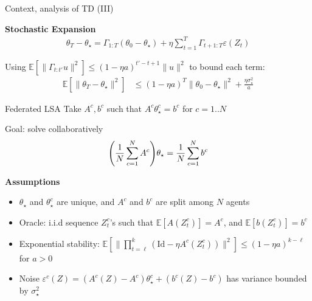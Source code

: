 \documentclass[aspectratio=169,14pt]{beamer}
\begin{document}
\begin{frame}[t]{Context, analysis of TD (III) }

  \textbf{Stochastic Expansion}
  \begin{align*}
    \theta_T - \theta_\star
    =
    \Gamma_{1:T} (\theta_0 - \theta_\star) + \eta \sum_{t=1}^T \Gamma_{t+1:T} \varepsilon(Z_t)
  \end{align*}

  \vspace{-0.5em}

  Using $\mathbb{E}[ \| \Gamma_{t:t'} u  \|^2 ] \le (1 - \eta a)^{t' - t + 1} \| u \|^2$ to bound each term:
  \begin{align*}
    \mathbb{E} [ \| \theta_T - \theta_\star \|^2 ]
    & \le
      (1 - \eta a)^T \| \theta_0 - \theta_\star \|^2
      + \frac{\eta \sigma_\star^2}{a}
  \end{align*}

  \vspace{0.5em}
  
\end{frame}


\begin{frame}{Federated LSA}
  Take $A^c, b^c$ such that $A^c \theta_\star^c = b^c$ for $c = 1 .. N$

  \pause
  
  Goal: solve collaboratively
  \begin{equation}
    \small
    \nonumber
    \Bigg( \frac{1}{N} \sum_{c=1}^{N} A^c \Bigg) \theta_\star
    = 
    \frac{1}{N} \sum_{c=1}^{N} b^c
  \end{equation}
  \vspace{-1em}

  \pause
  
  \textbf{Assumptions}

  \vspace{-0.5em}
  
  \begin{itemize}\setlength{\itemindent}{-1em}
    \small
  \item $\theta_\star$ and $\theta_\star^c$ are unique, and $A^c$ and $b^c$ are split among $N$ agents
    
  \item Oracle: i.i.d sequence $Z_{t}^c$'s such that
    $\mathbb{E} [A(Z_{t}^c)] = A^c$, and
    $\mathbb{E} [b(Z_{t}^c)] = b^c$
    
  \item Exponential stability: $\mathbb{E}[ \| \prod_{t=\ell}^k (\text{Id} - \eta A^c(Z_t^c)) \|^2 ] \le (1 - \eta a)^{k-\ell}$ for $a > 0$

  \item Noise $\varepsilon^c(Z) = (A^c(Z) - A^c) \theta_\star^c + (b^c(Z) - b^c)$ has variance bounded by $\sigma_\star^2$
  \end{itemize}

\end{frame}
\end{document}
